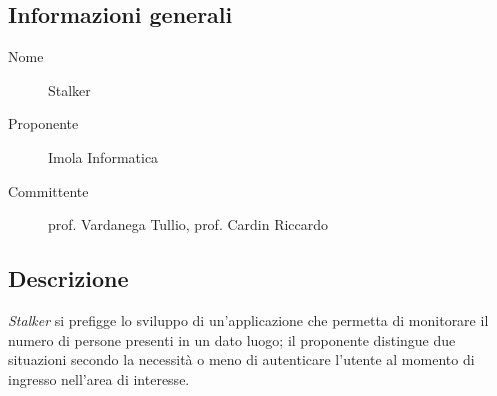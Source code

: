 \documentclass[../studio-di-fattibilita.tex]{subfiles}
\begin{document}
  \subsection{Informazioni generali}%
  \label{subsec:informazioni_generali}
  \begin{description}
    \item[Nome] Stalker
    \item[Proponente] Imola Informatica
    \item[Committente] prof. Vardanega Tullio, prof. Cardin Riccardo
  \end{description}


  \subsection{Descrizione}%
  \label{subsec:descrizione}
  \textit{Stalker} si prefigge lo sviluppo di un'applicazione che permetta di monitorare il numero di persone presenti in un dato luogo; il proponente distingue due situazioni secondo la necessità o meno di autenticare l'utente al momento di ingresso nell'area di interesse.
\end{document}
